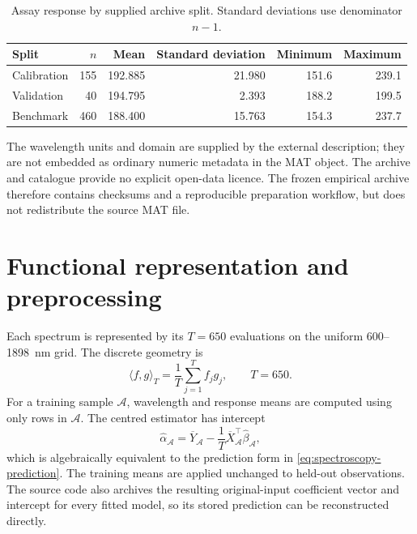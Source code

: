 \begin{table}[htbp]
    \centering
    \small
    \caption[Assay by supplied archive split]{Assay response by supplied archive split.  Standard deviations
    use denominator $n-1$.}
    \label{tab:app-spectroscopy-splits}
    \begin{tabular}{@{}lrrrrr@{}}
        \toprule
        Split & $n$ & Mean & Standard deviation & Minimum & Maximum \\
        \midrule
        Calibration & 155 & 192.885 & 21.980 & 151.6 & 239.1 \\
        Validation  &  40 & 194.795 &  2.393 & 188.2 & 199.5 \\
        Benchmark   & 460 & 188.400 & 15.763 & 154.3 & 237.7 \\
        \bottomrule
    \end{tabular}
\end{table}

The wavelength units and domain are supplied by the external description; they
are not embedded as ordinary numeric metadata in the MAT object.  The archive
and catalogue provide no explicit open-data licence.  The frozen empirical
archive therefore contains checksums and a reproducible preparation workflow,
but does not redistribute the source MAT file.

\section{Functional representation and preprocessing}
\label{sec:app-spectroscopy-preprocessing}

Each spectrum is represented by its $T=650$ evaluations on the uniform
600--1898~nm grid.  The discrete geometry is
\begin{equation}
    \langle f,g\rangle_T=\frac{1}{T}\sum_{j=1}^{T} f_jg_j,
    \qquad T=650.
    \label{eq:app-spectroscopy-inner-product}
\end{equation}
For a training sample $\mathcal A$, wavelength and response means are computed
using only rows in $\mathcal A$.  The centred estimator has intercept
\begin{equation}
    \widehat\alpha_{\mathcal A}
      =\overline Y_{\mathcal A}
       -\frac{1}{T}\overline X_{\mathcal A}^{\top}
        \widehat\beta_{\mathcal A},
    \label{eq:app-spectroscopy-intercept}
\end{equation}
which is algebraically equivalent to the prediction form in
\eqref{eq:spectroscopy-prediction}.  The training means are applied unchanged
to held-out observations.  The source code also archives the resulting
original-input coefficient vector and intercept for every fitted model, so its
stored prediction can be reconstructed directly.

